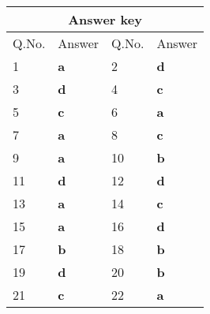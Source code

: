 \begin{table}[H]
	\centering
	\begin{tabular}{|p{1.5cm}|p{1.5cm}||p{1.5cm}|p{1.5cm}|}
		\hline
		\multicolumn{4}{|c|}{\textbf{Answer key}}\\\hline\hline
		\rowcolor{ocrel}Q.No.&Answer&Q.No.&Answer\\\hline
		1&\textbf{a} &2&\textbf{d}\\\hline 
		3&\textbf{d} &4&\textbf{c} \\\hline
		5&\textbf{c} &6&\textbf{a} \\\hline
		7&\textbf{a}&8&\textbf{c}\\\hline
		9&\textbf{a}&10&\textbf{b}\\\hline
		11&\textbf{d} &12&\textbf{d}\\\hline
		13&\textbf{a}&14&\textbf{c}\\\hline
		15&\textbf{a}&16&\textbf{d} \\\hline
		17&\textbf{b}&18&\textbf{b}\\\hline
		19&\textbf{d}&20&\textbf{b}\\\hline
		21&\textbf{c} &22&\textbf{a}\\\hline
	\end{tabular}
\end{table}



